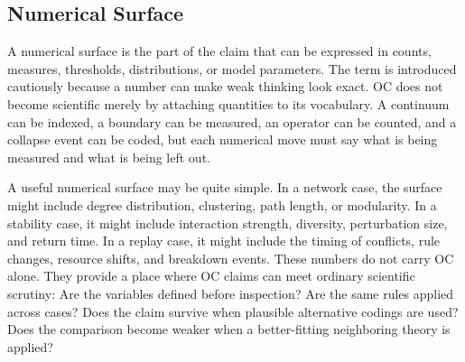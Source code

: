 \documentclass[11pt,a4paper,openany]{book}
\begin{document}
\subsection{Numerical Surface}
A numerical surface is the part of the claim that can be expressed in counts, measures, thresholds, distributions, or model parameters. The term is introduced cautiously because a number can make weak thinking look exact. OC does not become scientific merely by attaching quantities to its vocabulary. A continuum can be indexed, a boundary can be measured, an operator can be counted, and a collapse event can be coded, but each numerical move must say what is being measured and what is being left out. \cite{bak_soc,newman_networks}\par
A useful numerical surface may be quite simple. In a network case, the surface might include degree distribution, clustering, path length, or modularity. In a stability case, it might include interaction strength, diversity, perturbation size, and return time. In a replay case, it might include the timing of conflicts, rule changes, resource shifts, and breakdown events. These numbers do not carry OC alone. They provide a place where OC claims can meet ordinary scientific scrutiny: Are the variables defined before inspection? Are the same rules applied across cases? Does the claim survive when plausible alternative codings are used? Does the comparison become weaker when a better-fitting neighboring theory is applied?\par
\end{document}
